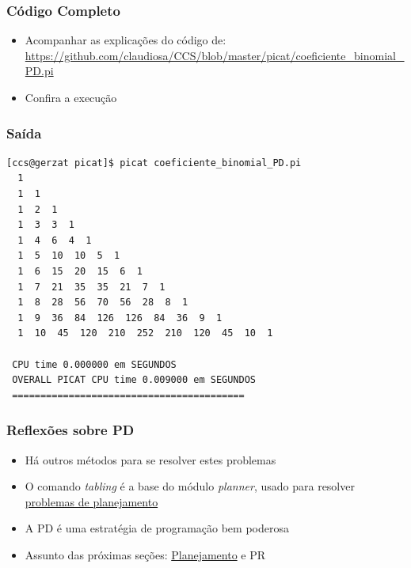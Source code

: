 \begin{frame}[fragile]
 \frametitle{Código Completo}

\begin{itemize}
  \item Acompanhar as explicações do código de:\\
\url{https://github.com/claudiosa/CCS/blob/master/picat/coeficiente_binomial_PD.pi}

  \item Confira a execuç\~ao
\end{itemize}
\end{frame}
\begin{frame}[fragile]

\frametitle{Saída}
\begin{footnotesize}
\begin{verbatim}
[ccs@gerzat picat]$ picat coeficiente_binomial_PD.pi 
  1 
  1  1 
  1  2  1 
  1  3  3  1 
  1  4  6  4  1 
  1  5  10  10  5  1 
  1  6  15  20  15  6  1 
  1  7  21  35  35  21  7  1 
  1  8  28  56  70  56  28  8  1 
  1  9  36  84  126  126  84  36  9  1 
  1  10  45  120  210  252  210  120  45  10  1 

 CPU time 0.000000 em SEGUNDOS 
 OVERALL PICAT CPU time 0.009000 em SEGUNDOS  
 =========================================
\end{verbatim}

\end{footnotesize}    

\end{frame}

\begin{frame}[fragile]
\frametitle{Reflexões sobre PD}


\begin{itemize}
  \item Há outros métodos para se resolver estes problemas

  \pause
  \item O comando \textit{tabling} é a base do módulo \textit{planner},
  usado para resolver \underline{problemas de planejamento}

  \pause
  \item A PD é uma estratégia de programação bem poderosa
  
  \pause
  \item Assunto das próximas seções:  \underline{Planejamento} e PR

  
\end{itemize}

\end{frame}

